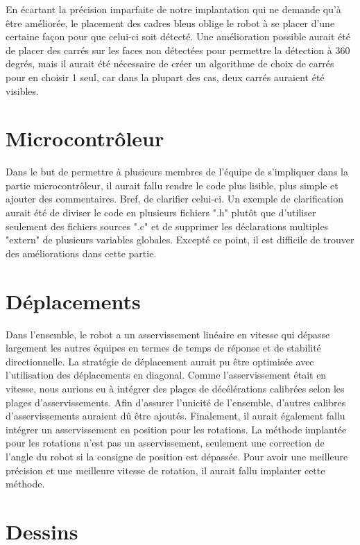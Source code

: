 En écartant la précision imparfaite de notre implantation qui ne demande qu'à être améliorée, le placement des cadres bleus oblige le robot à se placer d'une certaine façon pour que celui-ci soit détecté. Une amélioration possible aurait été de placer des carrés sur les faces non détectées pour permettre la détection à 360 degrés, mais il aurait été nécessaire de créer un algorithme de choix de carrés pour en choisir 1 seul, car dans la plupart des cas, deux carrés auraient été visibles.

\section{Microcontrôleur}
Dans le but de permettre à plusieurs membres de l'équipe de s'impliquer dans la partie microcontrôleur, il aurait fallu rendre le code plus lisible, plus simple et ajouter des commentaires. Bref, de clarifier celui-ci. Un exemple de clarification aurait été de diviser le code en plusieurs fichiers ".h" plutôt que d'utiliser seulement des fichiers sources ".c" et de supprimer les déclarations multiples "extern" de plusieurs variables globales. Excepté ce point, il est difficile de trouver des améliorations dans cette partie.

\section{Déplacements}

Dans l'ensemble, le robot a un asservissement linéaire en vitesse qui dépasse largement les autres équipes en termes de temps de réponse et de stabilité directionnelle. La stratégie de déplacement aurait pu être optimisée avec l'utilisation des déplacements en diagonal. Comme l'asservissement était en vitesse, nous aurions eu à intégrer des plages de décélérations calibrées selon les plages d'asservissements. Afin d'assurer l'unicité de l'ensemble, d'autres calibres d'asservissements auraient dû être ajoutés. Finalement, il aurait également fallu intégrer un asservissement en position pour les rotations. La méthode implantée pour les rotations n'est pas un asservissement, seulement une correction de l'angle du robot si la consigne de position est dépassée. Pour avoir une meilleure précision et une meilleure vitesse de rotation, il aurait fallu implanter cette méthode.

\section{Dessins}

